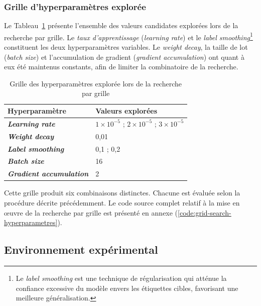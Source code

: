 \subsubsection{Grille d'hyperparamètres explorée}

Le Tableau~\ref{tab:grille_hyperparametres} présente l'ensemble des valeurs candidates explorées lors de la recherche par grille. Le \textit{taux d'apprentissage} (\textit{learning rate}) et le \textit{label smoothing}\footnote{Le \textit{label smoothing} est une technique de régularisation qui atténue la confiance excessive du modèle envers les étiquettes cibles, favorisant une meilleure généralisation.} constituent les deux hyperparamètres variables. Le \textit{weight decay}, la taille de lot (\textit{batch size}) et l'accumulation de gradient (\textit{gradient accumulation}) ont quant à eux été maintenus constants, afin de limiter la combinatoire de la recherche.

\begin{table}[H]
\centering
\renewcommand{\arraystretch}{1.5}
\begin{tabular}{p{5cm}p{7.5cm}}
\toprule
\textbf{Hyperparamètre} & \textbf{Valeurs explorées} \\
\midrule
\textbf{\textit{Learning rate}}         & $1\times10^{-5}$ ; $2\times10^{-5}$ ; $3\times10^{-5}$ \\
\textbf{\textit{Weight decay}}          & 0,01 \\
\textbf{\textit{Label smoothing}}       & 0,1 ; 0,2 \\
\textbf{\textit{Batch size}}            & 16 \\
\textbf{\textit{Gradient accumulation}} & 2 \\
\bottomrule
\end{tabular}
\caption{Grille des hyperparamètres explorée lors de la recherche par grille}
\label{tab:grille_hyperparametres}
\end{table}

Cette grille produit six combinaisons distinctes. Chacune est évaluée selon la procédure décrite précédemment. Le code source complet relatif à la mise en œuvre de la recherche par grille est présenté en annexe (\ref{code:grid-search-hyperparametres}).

\subsection{Environnement expérimental}
\label{subsec:environnement_experimental}

